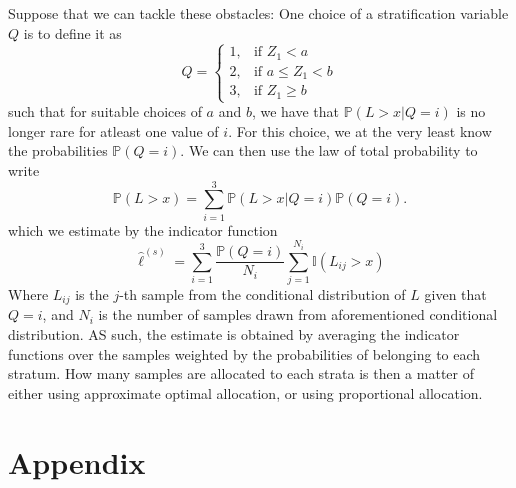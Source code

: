 \documentclass{article}
\begin{document}
Suppose that we can tackle these obstacles: One choice of a stratification variable $Q$ is to define it as
\begin{equation*}
    Q = \begin{cases}
        1, & \text{if } Z_1 < a\\
        2, & \text{if } a \leq Z_1 < b\\
        3, & \text{if } Z_1 \geq b
    \end{cases}
\end{equation*}
such that for suitable choices of $a$ and $b$, we have that $\mathbb{P}(L > x | Q = i)$ is no longer rare for atleast one value of $i$. For this choice, we at the very least know the probabilities $\mathbb{P}(Q = i)$. We can then use the law of total probability to write
\begin{equation*}
    \mathbb{P}(L > x) = \sum_{i=1}^3 \mathbb{P}(L > x | Q = i)\mathbb{P}(Q = i).
\end{equation*}
which we estimate by the indicator function
\begin{equation*}
    \hat{\ell}^{(s)} = \sum_{i=1}^3 \dfrac{\mathbb{P}(Q = i)}{N_i}\sum_{j=1}^{N_i}\mathbb{I}(L_{ij} > x)
\end{equation*}
Where $L_{ij}$ is the $j$-th sample from the conditional distribution of $L$ given that $Q = i$, and $N_i$ is the number of samples drawn from aforementioned conditional distribution. 
 AS such, the estimate is obtained by averaging the indicator functions over the samples weighted by the probabilities of belonging to each stratum. How many samples are allocated to each strata is then a matter of either using approximate optimal allocation, or using proportional allocation.


\section{Appendix}



\end{document}
